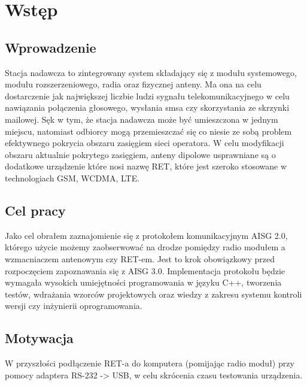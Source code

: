 \tableofcontents

\chapter{Wstęp}
\section{Wprowadzenie}
	Stacja nadawcza to zintegrowany system składający się z modułu systemowego, modułu rozszerzeniowego, radia oraz fizycznej anteny. 
	Ma ona na celu dostarczenie jak największej liczbie ludzi sygnału telekomunikacyjnego w celu nawiązania połączenia głosowego, 
	wysłania smsa czy skorzystania ze skrzynki mailowej. Sęk w tym, że stacja nadawcza może być umieszczona w jednym miejscu, 
	natomiast odbiorcy mogą przemieszczać się co niesie ze sobą problem efektywnego pokrycia obszaru zasięgiem sieci operatora.
	W celu modyfikacji obszaru aktualnie pokrytego zasięgiem, anteny dipolowe usprawniane są o dodatkowe urządzenie 
	które nosi nazwę RET, które jest szeroko stosowane w technologiach GSM, WCDMA, LTE.

\section{Cel pracy}
	Jako cel obrałem zaznajomienie się z protokołem komunikacyjnym AISG 2.0, którego użycie możemy zaobserwować na drodze pomiędzy 
	radio modułem a wzmacniaczem antenowym czy RET-em. 
	Jest to krok obowiązkowy przed rozpoczęciem zapoznawania się z AISG 3.0.
	Implementacja protokołu będzie wymagała wysokich umiejętności programowania w języku C++, 
	tworzenia testów, wdrażania wzorców projektowych oraz wiedzy z zakresu systemu kontroli wersji czy inżynierii oprogramowania.

\section{Motywacja}
	W przyszłości podłączenie RET-a do komputera (pomijając radio moduł) przy pomocy adaptera RS-232 -> USB, w celu skrócenia czasu testowania urządzenia.
